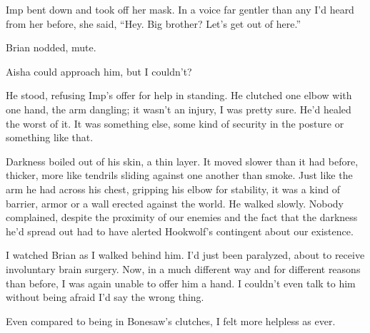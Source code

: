Imp bent down and took off her mask.  In a voice far gentler than any I'd heard from her before, she said, ``Hey.  Big brother?  Let's get out of here.''



Brian nodded, mute.



Aisha could approach him, but I couldn't?



He stood, refusing Imp's offer for help in standing.  He clutched one elbow with one hand, the arm dangling; it wasn't an injury, I was pretty sure.  He'd healed the worst of it.  It was something else, some kind of security in the posture or something like that.



Darkness boiled out of his skin, a thin layer.  It moved slower than it had before, thicker, more like tendrils sliding against one another than smoke.  Just like the arm he had across his chest, gripping his elbow for stability, it was a kind of barrier, armor or a wall erected against the world.  He walked slowly.  Nobody complained, despite the proximity of our enemies and the fact that the darkness he'd spread out had to have alerted Hookwolf's contingent about our existence.



I watched Brian as I walked behind him.  I'd just been paralyzed, about to receive involuntary brain surgery.  Now, in a much different way and for different reasons than before, I was again unable to offer him a hand.  I couldn't even talk to him without being afraid I'd say the wrong thing.



Even compared to being in Bonesaw's clutches, I felt more helpless as ever.





